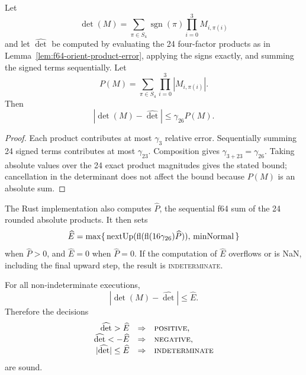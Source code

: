 \begin{lemma}\label{lem:f64-orient-det-error}
Let
\[
  \det(M)=\sum_{\pi\in S_4}\operatorname{sgn}(\pi)
    \prod_{i=0}^3 M_{i,\pi(i)}
\]
and let $\widehat{\det}$ be computed by evaluating the 24 four-factor products
as in Lemma~\ref{lem:f64-orient-product-error}, applying the signs exactly, and
summing the signed terms sequentially.  Let
\[
  P(M)=\sum_{\pi\in S_4}\prod_{i=0}^3 |M_{i,\pi(i)}|.
\]
Then
\[
  |\det(M)-\widehat{\det}|\le\gamma_{26}P(M).
\]
\end{lemma}

\begin{proof}
Each product contributes at most $\gamma_3$ relative error.  Sequentially
summing 24 signed terms contributes at most $\gamma_{23}$.  Composition gives
$\gamma_{3+23}=\gamma_{26}$.  Taking absolute values over the 24 exact product
magnitudes gives the stated bound; cancellation in the determinant does not
affect the bound because $P(M)$ is an absolute sum.
\end{proof}

\begin{proposition}\label{prop:f64-orient4-sign-filter}
The Rust implementation also computes $\widehat P$, the sequential f64 sum of
the 24 rounded absolute products.  It then sets
\[
  \widehat E =
    \max\{\,\operatorname{nextUp}(\operatorname{fl}(\operatorname{fl}(16\gamma_{26})\widehat P)),
      \,\mathrm{minNormal}\,\}
\]
when $\widehat P>0$, and $\widehat E=0$ when $\widehat P=0$.  If the computation
of $\widehat E$ overflows or is NaN, including the final upward step, the result
is \textsc{indeterminate}.

For all non-indeterminate executions,
\[
  |\det(M)-\widehat{\det}| \le \widehat E.
\]
Therefore the decisions
\[
\begin{array}{rcl}
  \widehat{\det}>\widehat E &\Rightarrow& \textsc{positive},\\
  \widehat{\det}<-\widehat E &\Rightarrow& \textsc{negative},\\
  |\widehat{\det}|\le \widehat E &\Rightarrow& \textsc{indeterminate}
\end{array}
\]
are sound.
\end{proposition}

